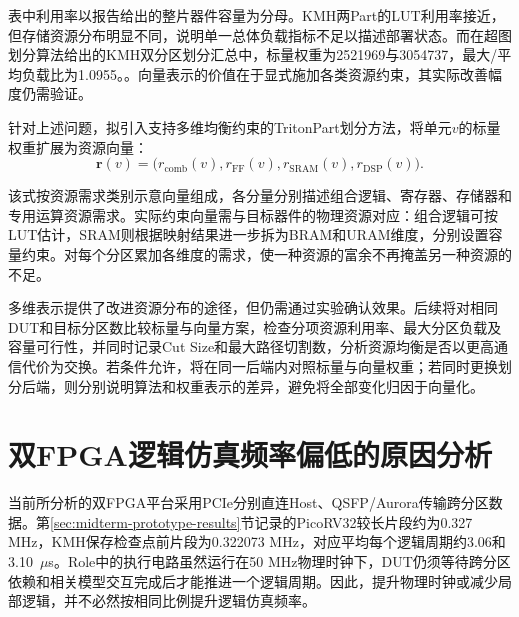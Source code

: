 表中利用率以报告给出的整片器件容量为分母。KMH两Part的LUT利用率接近，但存储资源分布明显不同，说明单一总体负载指标不足以描述部署状态。而在超图划分算法给出的KMH双分区划分汇总中，标量权重为2521969与3054737，最大/平均负载比为1.0955。。向量表示的价值在于显式施加各类资源约束，其实际改善幅度仍需验证。

\begin{samepage}
    针对上述问题，拟引入支持多维均衡约束的TritonPart划分方法\cite{tritonpart_2023}，将单元$v$的标量权重扩展为资源向量：
    \begin{equation}
        \boldsymbol{r}(v)=\bigl(r_{\mathrm{comb}}(v),r_{\mathrm{FF}}(v),r_{\mathrm{SRAM}}(v),r_{\mathrm{DSP}}(v)\bigr).
        \label{eq:midterm-planned-resource-vector}
    \end{equation}
\end{samepage}
该式按资源需求类别示意向量组成，各分量分别描述组合逻辑、寄存器、存储器和专用运算资源需求。实际约束向量需与目标器件的物理资源对应：组合逻辑可按LUT估计，SRAM则根据映射结果进一步拆为BRAM和URAM维度，分别设置容量约束。对每个分区累加各维度的需求，使一种资源的富余不再掩盖另一种资源的不足。

多维表示提供了改进资源分布的途径，但仍需通过实验确认效果。后续将对相同DUT和目标分区数比较标量与向量方案，检查分项资源利用率、最大分区负载及容量可行性，并同时记录Cut Size和最大路径切割数，分析资源均衡是否以更高通信代价为交换。若条件允许，将在同一后端内对照标量与向量权重；若同时更换划分后端，则分别说明算法和权重表示的差异，避免将全部变化归因于向量化。


\section{双FPGA逻辑仿真频率偏低的原因分析}
\label{sec:midterm-dual-fpga-performance-problem}

当前所分析的双FPGA平台采用PCIe分别直连Host、QSFP/Aurora传输跨分区数据。第\ref{sec:midterm-prototype-results}节记录的PicoRV32较长片段约为0.327 MHz，KMH保存检查点前片段为0.322073 MHz，对应平均每个逻辑周期约3.06和3.10~$\mu$s。Role中的执行电路虽然运行在50 MHz物理时钟下，DUT仍须等待跨分区依赖和相关模型交互完成后才能推进一个逻辑周期。因此，提升物理时钟或减少局部逻辑，并不必然按相同比例提升逻辑仿真频率。

